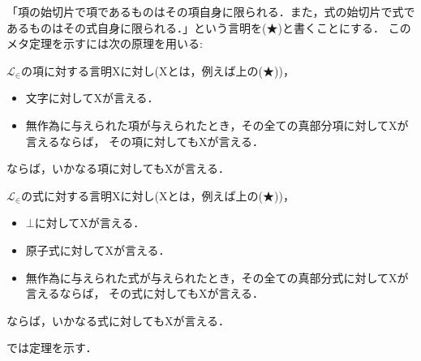 	「項の始切片で項であるものはその項自身に限られる．また，式の始切片で式であるものはその式自身に限られる．」という言明を(★)と書くことにする．
	このメタ定理を示すには次の原理を用いる:
	
	\begin{screen}
		\begin{metaaxm}
			$\mathcal{L}_{\in}$の項に対する言明Xに対し(Xとは，例えば上の(★))，
			\begin{itemize}
				\item 文字に対してXが言える．
				\item 無作為に与えられた項が与えられたとき，その全ての真部分項に対してXが言えるならば，
					その項に対してもXが言える．
			\end{itemize}
			ならば，いかなる項に対してもXが言える．
		\end{metaaxm}
	\end{screen}
	
	\begin{screen}
		\begin{metaaxm}
			$\mathcal{L}_{\in}$の式に対する言明Xに対し(Xとは，例えば上の(★))，
			\begin{itemize}
				\item $\bot$に対してXが言える．
				\item 原子式に対してXが言える．
				\item 無作為に与えられた式が与えられたとき，その全ての真部分式に対してXが言えるならば，
					その式に対してもXが言える．
			\end{itemize}
			ならば，いかなる式に対してもXが言える．
		\end{metaaxm}
	\end{screen}
	
	では定理を示す．
	
